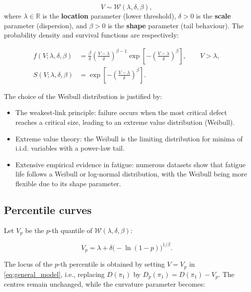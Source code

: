\begin{equation}
V \sim \mathcal{W}(\lambda,\delta,\beta),
\end{equation}
where \(\lambda \in \mathbb{R}\) is the \textbf{location} parameter (lower threshold), \(\delta > 0\) is the \textbf{scale} parameter (dispersion), and \(\beta > 0\) is the \textbf{shape} parameter (tail behaviour). The probability density and survival functions are respectively:

\begin{align}
f(V;\lambda,\delta,\beta) &= \frac{\beta}{\delta}\left(\frac{V-\lambda}{\delta}\right)^{\beta-1}\exp\left[-\left(\frac{V-\lambda}{\delta}\right)^{\beta}\right],\qquad V>\lambda,\\
S(V;\lambda,\delta,\beta) &= \exp\left[-\left(\frac{V-\lambda}{\delta}\right)^{\beta}\right].
\end{align}

The choice of the Weibull distribution is justified by:
\begin{itemize}
    \item The weakest‑link principle: failure occurs when the most critical defect reaches a critical size, leading to an extreme value distribution (Weibull).
    \item Extreme value theory: the Weibull is the limiting distribution for minima of i.i.d. variables with a power‑law tail.
    \item Extensive empirical evidence in fatigue: numerous datasets show that fatigue life follows a Weibull or log‑normal distribution, with the Weibull being more flexible due to its shape parameter.
\end{itemize}

\subsection{Percentile curves}

Let \(V_p\) be the \(p\)-th quantile of \(\mathcal{W}(\lambda,\delta,\beta)\):

\begin{equation}\label{eq:Vp}
V_p = \lambda + \delta\bigl(-\ln(1-p)\bigr)^{1/\beta}.
\end{equation}

The locus of the \(p\)-th percentile is obtained by setting \(V = V_p\) in \eqref{eq:general_model}, i.e., replacing \(D(\pi_1)\) by \(D_p(\pi_1) = D(\pi_1) - V_p\). The centres remain unchanged, while the curvature parameter becomes:

